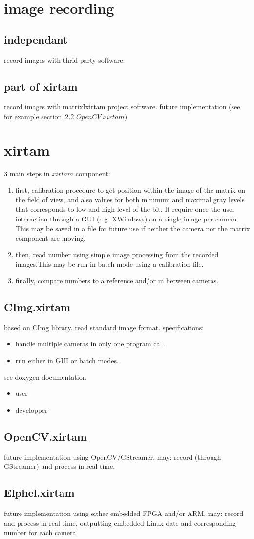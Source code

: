 \documentclass[10pt,a4paper]{report}
\begin{document}
\chapter{image recording}
\section{independant}
record images with thrid party software.
\section{part of xirtam}
record images with matrixIxirtam project software.
future implementation (see for example section~\ref{OpenCV.xirtam} $OpenCV.xirtam$)

\chapter{xirtam}
3 main steps in $xirtam$ component:
\begin{enumerate}
\item first, calibration procedure to get position within the image of the matrix on the field of view, and also values for both minimum and maximal gray levels that corresponds to low and high level of the bit. It require once the user interaction through a GUI (e.g. XWindows) on a single image per camera. This may be saved in a file for future use if neither the camera nor the matrix component are moving.
\item then, read number using simple image processing from the recorded images.This may be run in batch mode using a calibration file.
\item finally, compare numbers to a reference and/or in between cameras.
\end{enumerate}
\section{CImg.xirtam}\label{CImg.xirtam} 
based on CImg library.
read standard image format.
specifications:
\begin{itemize}
\item handle multiple cameras in only one program call.
\item run either in GUI or batch modes.
\end{itemize}
see doxygen documentation
\begin{itemize}
\item user
\item developper
\end{itemize}
\section{OpenCV.xirtam}\label{OpenCV.xirtam} 
future implementation using OpenCV/GStreamer.
may: record (through GStreamer) and process in real time.
\section{Elphel.xirtam}
future implementation using either embedded FPGA and/or ARM.
may: record and process in real time, outputting embedded Linux date and corresponding number for each camera.
\end{document}
